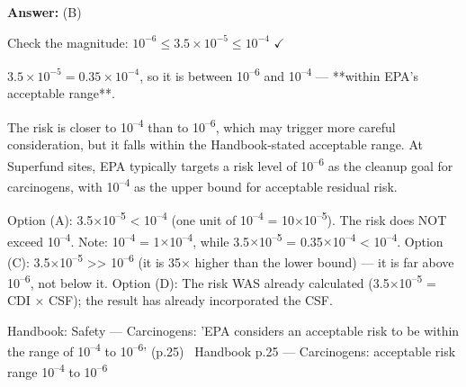 \documentclass[11pt]{article}
\begin{document}
\vspace{2pt}\par\noindent\colorbox{boxbg}{\parbox{\dimexpr\linewidth-2\fboxsep\relax}{%
\vspace{2pt}\textbf{Answer:} (B)\par\vspace{2pt}
{\small Check the magnitude: $10^{-6} \leq 3.5 \times 10^{-5} \leq 10^{-4}$ $\checkmark$

$3.5 \times 10^{-5} = 0.35 \times 10^{-4}$, so it is between 10\textsuperscript{--}\textsuperscript{6} and 10\textsuperscript{--}\textsuperscript{4} --- **within EPA's acceptable range**.

The risk is closer to 10\textsuperscript{--}\textsuperscript{4} than to 10\textsuperscript{--}\textsuperscript{6}, which may trigger more careful consideration, but it falls within the Handbook-stated acceptable range. At Superfund sites, EPA typically targets a risk level of 10\textsuperscript{--}\textsuperscript{6} as the cleanup goal for carcinogens, with 10\textsuperscript{--}\textsuperscript{4} as the upper bound for acceptable residual risk.

Option (A): 3.5$\times$10\textsuperscript{--}\textsuperscript{5} < 10\textsuperscript{--}\textsuperscript{4} (one unit of 10\textsuperscript{--}\textsuperscript{4} = 10$\times$10\textsuperscript{--}\textsuperscript{5}). The risk does NOT exceed 10\textsuperscript{--}\textsuperscript{4}. Note: 10\textsuperscript{--}\textsuperscript{4} = 1$\times$10\textsuperscript{--}\textsuperscript{4}, while 3.5$\times$10\textsuperscript{--}\textsuperscript{5} = 0.35$\times$10\textsuperscript{--}\textsuperscript{4} < 10\textsuperscript{--}\textsuperscript{4}. Option (C): 3.5$\times$10\textsuperscript{--}\textsuperscript{5} >> 10\textsuperscript{--}\textsuperscript{6} (it is 35$\times$ higher than the lower bound) --- it is far above 10\textsuperscript{--}\textsuperscript{6}, not below it. Option (D): The risk WAS already calculated (3.5$\times$10\textsuperscript{--}\textsuperscript{5} = CDI $\times$ CSF); the result has already incorporated the CSF.}\par\vspace{2pt}
{\footnotesize\color{soft}Handbook: Safety --- Carcinogens: 'EPA considers an acceptable risk to be within the range of 10\textsuperscript{--}\textsuperscript{4} to 10\textsuperscript{--}\textsuperscript{6}' (p.25) \textbullet\ Handbook p.25 --- Carcinogens: acceptable risk range 10\textsuperscript{--}\textsuperscript{4} to 10\textsuperscript{--}\textsuperscript{6}}\vspace{2pt}
}}
\end{document}
